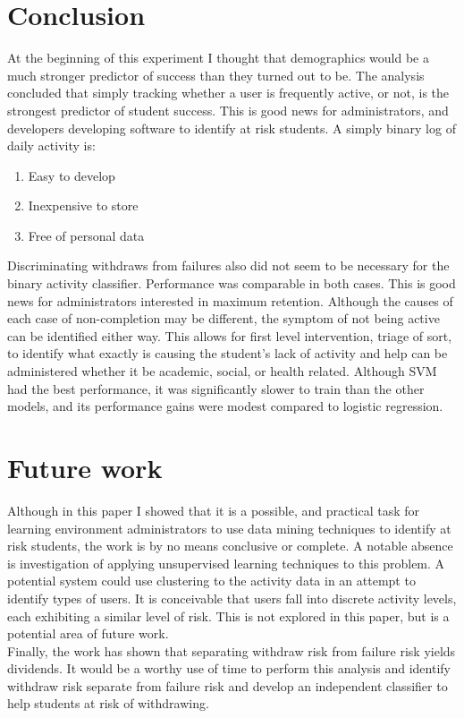 \documentclass{article}
\begin{document}
\section{Conclusion}
At the beginning of this experiment I thought that demographics would be a much stronger predictor of success than they turned out to be. The analysis concluded that simply tracking whether a user is frequently active, or not, is the strongest predictor of student success. This is good news for administrators, and developers developing software to identify at risk students. A simply binary log of daily activity is:
\begin{enumerate}
	\item Easy to develop
	\item Inexpensive to store
	\item Free of personal data
\end{enumerate}
Discriminating withdraws from failures also did not seem to be necessary for the binary activity classifier. Performance was comparable in both cases. This is good news for administrators interested in maximum retention. Although the causes of each case of non-completion may be different, the symptom of not being active can be identified either way. This allows for first level intervention, triage of sort, to identify what exactly is causing the student's lack of activity and help can be administered whether it be academic, social, or health related. Although SVM had the best performance, it was significantly slower to train than the other models, and its performance gains were modest compared to logistic regression.


\section{Future work}
Although in this paper I showed that it is a possible, and practical task for learning environment administrators to use data mining techniques to identify at risk students, the work is by no means conclusive or complete. A notable absence is investigation of applying unsupervised learning techniques to this problem. A potential system could use clustering to the activity data in an attempt to identify types of users. It is conceivable that users fall into discrete activity levels, each exhibiting a similar level of risk. This is not explored in this paper, but is a potential area of future work.\\

Finally, the work has shown that separating withdraw risk from failure risk yields dividends. It would be a worthy use of time to perform this analysis and identify withdraw risk separate from failure risk and develop an independent classifier to help students at risk of withdrawing.
\end{document}

